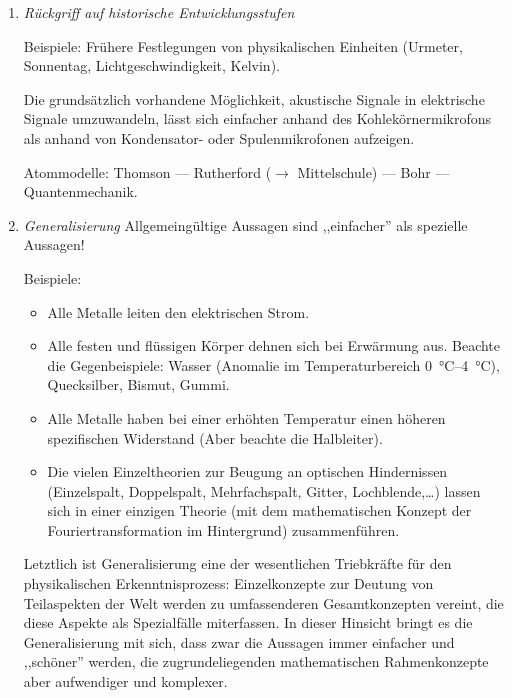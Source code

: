 \begin{enumerate}
\item { \it R\"{u}ckgriff auf historische Entwicklungsstufen }

\mip
Beispiele:
Fr\"{u}here Festlegungen von physikalischen Einheiten
(Urmeter, Sonnentag,
Lichtgeschwindigkeit, Kelvin).

\mip
Die grunds\"{a}tzlich vorhandene M\"{o}glichkeit, akustische Signale
in elektrische
Signale umzuwandeln, l\"{a}sst sich einfacher anhand des
Kohlek\"{o}rnermikrofons
als anhand von Kondensator- oder Spulenmikrofonen aufzeigen.

\mip
Atommodelle: Thomson --- Rutherford ($\to$ Mittelschule) ---
Bohr --- Quantenmechanik.

\item { \it Generalisierung }
Allgemeing\"{u}ltige Aussagen sind ,,einfacher'' als spezielle Aussagen!

\mip
Beispiele:\begin{itemize}
\item Alle Metalle leiten den elektrischen Strom.
\item Alle festen und fl\"{u}ssigen K\"{o}rper dehnen sich bei Erw\"{a}rmung aus.
\nip
Beachte die Gegenbeispiele: Wasser (Anomalie im Temperaturbereich
\SIrange{0}{4}{\celsius}), Quecksilber, Bismut, Gummi.
\item Alle Metalle haben bei einer erh\"{o}hten Temperatur einen h\"{o}heren
spezifischen Widerstand (Aber beachte die Halbleiter).
\item
Die vielen Einzeltheorien zur Beugung an optischen
Hindernissen (Einzelspalt, Doppelspalt, Mehrfachspalt, Gitter,
Lochblende,\dots) lassen sich in einer einzigen Theorie
(mit dem mathematischen Konzept der Fouriertransformation
im Hintergrund) zusammenf\"{u}hren.
\end{itemize}

Letztlich ist Generalisierung eine der wesentlichen Triebkr\"{a}fte
f\"{u}r den physikalischen Erkenntnisprozess: Einzelkonzepte zur Deutung
von Teilaspekten der Welt werden zu umfassenderen Gesamtkonzepten
vereint, die diese Aspekte als Spezialf\"{a}lle miterfassen.
In dieser Hinsicht bringt es die Generalisierung mit sich,
dass zwar die Aussagen immer einfacher und ,,sch\"{o}ner'' werden,
die zugrundeliegenden mathematischen Rahmenkonzepte aber
aufwendiger und komplexer.


\end{enumerate}
